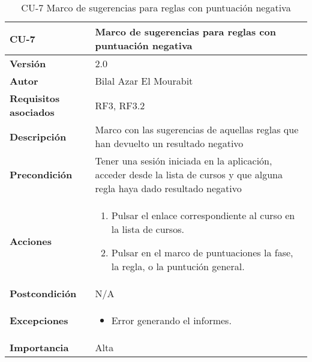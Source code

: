 \begin{table}[H]
	\centering
	\begin{tabularx}{\linewidth}{ p{} p{} }
		\toprule
		\textbf{CU-7}    & \textbf{Marco de sugerencias para reglas con puntuación negativa}\\
		\toprule
		\textbf{Versión}              & 2.0    \\
		\textbf{Autor}                & Bilal Azar El Mourabit \\
		\textbf{Requisitos asociados} & RF3, RF3.2 \\
		\textbf{Descripción}          & Marco con las sugerencias de aquellas reglas que han devuelto un resultado negativo \\
    		\textbf{Precondición}         & Tener una sesión iniciada en la aplicación, acceder desde la lista de cursos y que alguna regla haya dado resultado negativo \\
		\textbf{Acciones}             & 
		\begin{enumerate}
			\def\labelenumi{\arabic{enumi}.}
			\tightlist
			\item Pulsar el enlace correspondiente al curso en la lista de cursos.
            \item Pulsar en el marco de puntuaciones la fase, la regla, o la puntución general. 
		\end{enumerate}\\
		\textbf{Postcondición}        & N/A \\
		\textbf{Excepciones}          & \begin{itemize}
		    \item Error generando el informes.
		\end{itemize} \\
		\textbf{Importancia}          & Alta \\
		\bottomrule
	\end{tabularx}
	\caption{CU-7 Marco de sugerencias para reglas con puntuación negativa}
\end{table}

